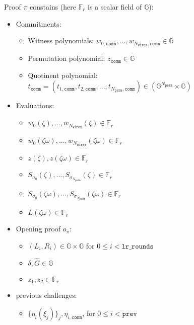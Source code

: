 Proof $\pi$ constains (here $\mathbb{F}_r$ is a scalar field of $\mathbb{G}$):
\begin{itemize}\label{proof-state}
	\item Commitments:
	\begin{itemize}
		\item Witness polynomials: $w_{0, \texttt{comm}}, ..., w_{N_{\texttt{wires}}, \texttt{comm}} \in \mathbb{G}$
		\item Permutation polynomial: $z_{\texttt{comm}} \in \mathbb{G}$
		\item Quotinent polynomial: $t_{\texttt{comm}} = (t_{1, \texttt{comm}}, t_{2, \texttt{comm}}, ...,  t_{N_{\texttt{perm}}, \texttt{comm}}) \in (\mathbb{G}^{N_{\texttt{perm}}} \times \mathbb{G})$
	\end{itemize}
	\item Evaluations:
	\begin{itemize}
		\item $w_0(\zeta), ..., w_{N_{\texttt{wires}}}(\zeta) \in \mathbb{F}_r$
		\item $w_0(\zeta\omega), ..., w_{N_{\texttt{wires}}}(\zeta\omega) \in \mathbb{F}_r$
		\item $z(\zeta), z(\zeta\omega) \in \mathbb{F}_r$
		\item $S_{\sigma_0}(\zeta), ...,S_{\sigma_{N_{\texttt{perm}}}}(\zeta) \in \mathbb{F}_r$
		\item $S_{\sigma_0}(\zeta\omega), ..., S_{\sigma_{N_{\texttt{perm}}}}(\zeta\omega) \in \mathbb{F}_r$
		\item $\bar{L}(\zeta\omega) \in \mathbb{F}_r$
	\end{itemize}
	\item Opening proof $o_\pi$:
	\begin{itemize}
		\item $(L_i, R_i) \in \mathbb{G} \times \mathbb{G}$ for $0 \leq i < \texttt{lr\_rounds}$ %
		\item $\delta, \hat{G} \in \mathbb{G}$
		\item $z_1, z_2 \in \mathbb{F}_{r}$
	\end{itemize}
	\item previous challenges:
	\begin{itemize}
		\item $\{\eta_i(\xi_j)\}_{j}, \eta_{i, \texttt{comm}}$, for $0 \leq i < \texttt{prev}$
	\end{itemize}
\end{itemize}



